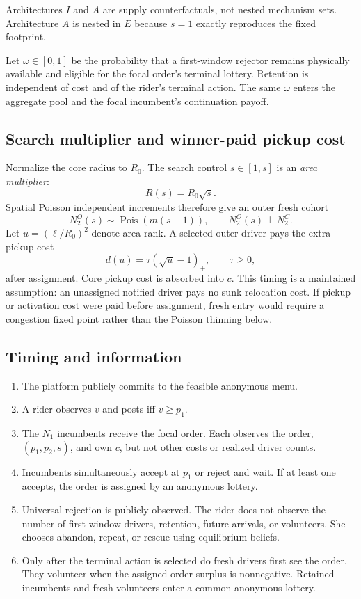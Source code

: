 \documentclass[11pt]{article}
\theoremstyle{definition}
\theoremstyle{remark}
\begin{document}
Architectures $I$ and $A$ are supply counterfactuals, not nested mechanism
sets.  Architecture $A$ is nested in $E$ because $s=1$ exactly reproduces the
fixed footprint.

Let $\omega\in[0,1]$ be the probability that a first-window rejector remains
physically available and eligible for the focal order's terminal lottery.
Retention is independent of cost and of the rider's terminal action.  The
same $\omega$ enters the aggregate pool and the focal incumbent's continuation
payoff.

\subsection{Search multiplier and winner-paid pickup cost}

Normalize the core radius to $R_0$.  The search control $s\in[1,\bar s]$ is an
\emph{area multiplier}:
\[
R(s)=R_0\sqrt{s}.
\]
Spatial Poisson independent increments therefore give an outer fresh cohort
\[
N_2^O(s)\sim\operatorname{Pois}(m(s-1)),
\qquad N_2^O(s)\perp N_2^C.
\]
Let $u=(\ell/R_0)^2$ denote area rank.  A selected outer driver pays the extra
pickup cost
\[
d(u)=\tau(\sqrt u-1)_+,
\qquad \tau\ge0,
\]
after assignment.  Core pickup cost is absorbed into $c$.  This timing is a
maintained assumption: an unassigned notified driver pays no sunk relocation
cost.  If pickup or activation cost were paid before assignment, fresh entry
would require a congestion fixed point rather than the Poisson thinning below.

\subsection{Timing and information}

\begin{enumerate}[leftmargin=2em]
\item The platform publicly commits to the feasible anonymous menu.
\item A rider observes $v$ and posts iff $v\ge p_1$.
\item The $N_1$ incumbents receive the focal order.  Each observes the order,
$(p_1,p_2,s)$, and own $c$, but not other costs or realized driver counts.
\item Incumbents simultaneously accept at $p_1$ or reject and wait.  If at
least one accepts, the order is assigned by an anonymous lottery.
\item Universal rejection is publicly observed.  The rider does not observe
the number of first-window drivers, retention, future arrivals, or volunteers.
She chooses abandon, repeat, or rescue using equilibrium beliefs.
\item Only after the terminal action is selected do fresh drivers first see
the order.  They volunteer when the assigned-order surplus is nonnegative.
Retained incumbents and fresh volunteers enter a common anonymous lottery.
\end{enumerate}
\end{document}
